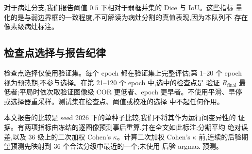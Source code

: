 对于病灶分支,我们报告阈值 $0.5$ 下相对于弱框并集的 Dice 与 IoU。这些指标
量化的是与弱边界框的一致程度,不可解读为病灶分割的真值表现,因为本队列不
存在像素级病灶标注。

\subsection{检查点选择与报告纪律}

检查点选择仅使用验证集。每个 epoch 都在验证集上完整评估;第 1--20 个
epoch 视为预热期,不参与选择。在第 21--120 个 epoch 中,选中的检查点是
验证 $R_{\mathrm{final}}$ 最低者;平局时依次取验证图像级 COR 更低者、epoch
更早者。不使用平滑、早停或选择器重采样。测试集在检查点、阈值或校准的选择
中不起任何作用。

本文报告的比较是 seed 2026 下的单种子比较,我们不将其作为运行间变异性的
证据。有两项指标由冻结的逐图像预测事后重算,并在全文如此标注:分期平均
绝对误差,以及 36 级上的二次加权 Cohen's $\kappa$。计算二次加权 Cohen's
$\kappa$ 前,连续的后验期望预测先映射到 36 个合法分级中最近的一个;未使用
后验 argmax 预测。
